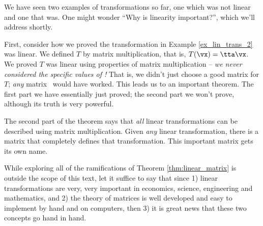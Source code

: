We have seen two examples of transformations so far, one which was not linear and one that was. One might wonder ``Why is linearity important?'', which we'll address shortly.

First, consider how we proved the transformation in Example \ref{ex_lin_trans_2} was linear. We defined $T$ by matrix multiplication, that is, $T(\vx) = \tta\vx$. We proved $T$ was linear using properties of matrix multiplication -- \textit{we never considered the specific values of \tta!} That is, we didn't just choose a good matrix for $T$; \textit{any} matrix \tta\ would have worked. This leads us to an important theorem. The first part we have essentially just proved; the second part we won't prove, although its truth is very powerful.


The second part of the theorem says that \textit{all} linear transformations can be described using matrix multiplication. Given \textit{any} linear transformation, there is a matrix that completely defines that transformation. This important matrix gets its own name.



While exploring all of the ramifications of Theorem \ref{thm:linear_matrix} is outside the scope of this text, let it suffice to say that since 1) linear transformations are very, very important in economics, science, engineering and mathematics, and 2) the theory of matrices is well developed and easy to implement by hand and on computers, then 3) it is great news that these two concepts go hand in hand.

